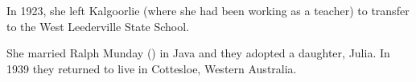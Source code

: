 
In 1923, she left Kalgoorlie (where she had been working as a teacher) to transfer to the West Leederville State School.\cite{VMkal}

She married Ralph Munday () in Java\cite{LadiesSection} and they adopted a daughter, Julia. In 1939 they returned to live in Cottesloe, Western Australia. 
